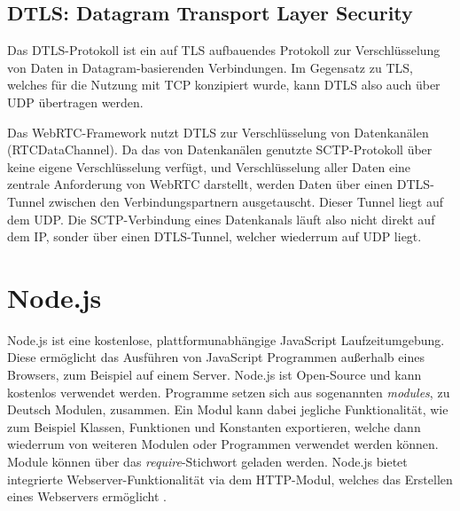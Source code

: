 
\subsection{DTLS: Datagram Transport Layer Security}
Das \acf{DTLS}-Protokoll ist ein auf \acf{TLS} aufbauendes Protokoll zur Verschlüsselung von Daten in Datagram-basierenden Verbindungen. Im Gegensatz zu \acs{TLS}, welches für die Nutzung mit \acs{TCP} konzipiert wurde, kann \acs{DTLS} also auch über \acs{UDP} übertragen werden.\par

Das \acs{WebRTC}-Framework nutzt \acs{DTLS} zur Verschlüsselung von Datenkanälen (RTCDataChannel). Da das von Datenkanälen genutzte \acs{SCTP}-Protokoll über keine eigene Verschlüsselung verfügt, und Verschlüsselung aller Daten eine zentrale Anforderung von \acs{WebRTC} darstellt, werden Daten über einen \acs{DTLS}-Tunnel zwischen den Verbindungspartnern ausgetauscht. Dieser Tunnel liegt auf dem \acf{UDP}. Die \acs{SCTP}-Verbindung eines Datenkanals läuft also nicht direkt auf dem \acf{IP}, sonder über einen \acs{DTLS}-Tunnel, welcher wiederrum auf \acs{UDP} liegt.

\section{Node.js}
Node.js ist eine kostenlose, plattformunabhängige JavaScript Laufzeitumgebung.
Diese ermöglicht das Ausführen von JavaScript Programmen außerhalb eines Browsers, zum Beispiel auf einem Server. Node.js ist Open-Source und kann kostenlos verwendet werden. Programme setzen sich aus sogenannten \textit{modules}, zu Deutsch Modulen, zusammen. Ein Modul kann dabei jegliche Funktionalität, wie zum Beispiel Klassen, Funktionen und Konstanten exportieren, welche dann wiederrum von weiteren Modulen oder Programmen verwendet werden können. Module können über das \textit{require}-Stichwort geladen werden. Node.js bietet integrierte Webserver-Funktionalität via dem \acs{HTTP}-Modul, welches das Erstellen eines Webservers ermöglicht \cite{nodejs}.\par 

